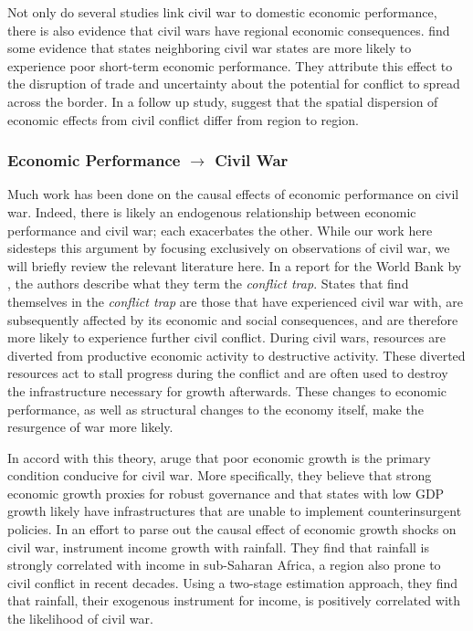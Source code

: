 Not only do several studies link civil war to domestic economic performance, there is also evidence that civil wars have regional economic consequences.  \cite{murdoch:sandler:2002a} find some evidence that states neighboring civil war states are more likely to experience poor short-term economic performance.  They attribute this effect to the disruption of trade and uncertainty about the potential for conflict to spread across the border.  In a follow up study, \cite{murdoch:sandler:2002b} suggest that the spatial dispersion of economic effects from civil conflict differ from region to region.

\subsubsection{Economic Performance $\rightarrow$ Civil War}

Much work has been done on the causal effects of economic performance on civil war.  Indeed, there is likely an endogenous relationship between economic performance and civil war; each exacerbates the other.  While our work here sidesteps this argument by focusing exclusively on observations of civil war, we will briefly review the relevant literature here.  In a report for the World Bank by \cite{collier:etal:2003}, the authors describe what they term the \textit{conflict trap}.  States that find themselves in the \textit{conflict trap} are those that have experienced civil war with, are subsequently affected by its economic and social consequences, and are therefore more likely to experience further civil conflict.  During civil wars, resources are diverted from productive economic activity to destructive activity.  These diverted resources act to stall progress during the conflict and are often used to destroy the infrastructure necessary for growth afterwards.  These changes to economic performance, as well as structural changes to the economy itself, make the resurgence of war more likely.  

In accord with this theory, \cite{fearon:laitin:2003} aruge that poor economic growth is the primary condition conducive for civil war.  More specifically, they believe that strong economic growth proxies for robust governance and that states with low GDP growth likely have infrastructures that are unable to implement counterinsurgent policies.  In an effort to parse out the causal effect of economic growth shocks on civil war, \cite{miguel:etal:2004} instrument income growth with rainfall.  They find that rainfall is strongly correlated with income in sub-Saharan Africa, a region also prone to civil conflict in recent decades.   Using a two-stage estimation approach, they find that rainfall, their exogenous instrument for income, is positively correlated with the likelihood of civil war.

